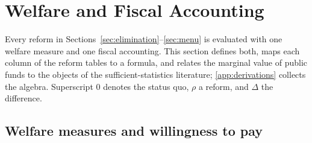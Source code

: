 \section{Welfare and Fiscal Accounting}\label{sec:accounting}

Every reform in Sections~\ref{sec:elimination}--\ref{sec:menu} is evaluated with one welfare measure and one fiscal accounting. This section defines both, maps each column of the reform tables to a formula, and relates the marginal value of public funds to the objects of the sufficient-statistics literature; \autoref{app:derivations} collects the algebra. Superscript $0$ denotes the status quo, $\rho$ a reform, and $\Delta$ the difference.

\subsection{Welfare measures and willingness to pay}\label{sec:welfare}

